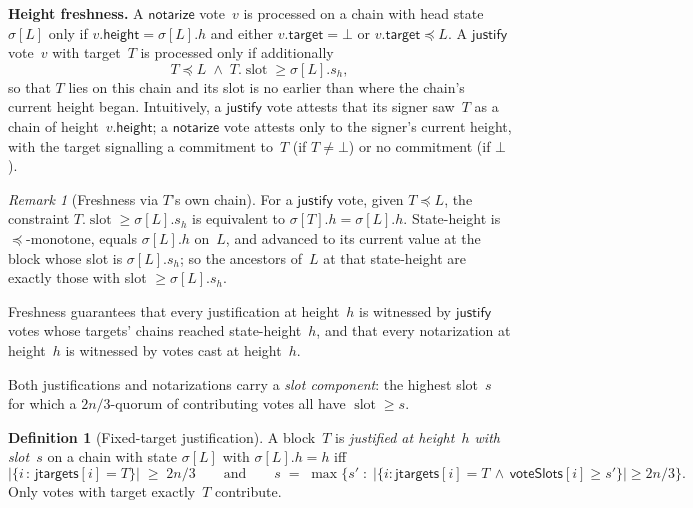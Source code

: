 \documentclass{article}
\newcommand{\slot}[0]{\ensuremath{\operatorname{\mathrm{slot}}}}
\newcommand{\target}{\mathsf{target}}
\newcommand{\height}{\mathsf{height}}
\newcommand{\just}{\ensuremath{\mathsf{justify}}\xspace}
\newcommand{\notar}{\ensuremath{\mathsf{notarize}}\xspace}
\newcommand{\jtargets}{\mathsf{jtargets}}
\newcommand{\voteSlots}{\mathsf{voteSlots}}
\renewcommand{\paragraph}[1]{\vspace{7pt}\noindent\textbf{#1}}
\theoremstyle{plain}
\theoremstyle{definition}
\newtheorem{definition}[theorem]{Definition}
\theoremstyle{remark}
\newtheorem{remark}[theorem]{Remark}
\begin{document}
\paragraph{Height freshness.}
A \notar vote~$v$ is processed on a chain with head state $\sigma[L]$ only if $v.\height = \sigma[L].h$ and either $v.\target = \bot$ or $v.\target \preceq L$.
A \just vote~$v$ with target~$T$ is processed only if additionally
\[
  T \preceq L \;\wedge\; T.\slot \geq \sigma[L].s_h,
\]
so that $T$ lies on this chain and its slot is no earlier than where the chain's current height began.
Intuitively, a \just vote attests that its signer saw~$T$ as a chain of height~$v.\height$; a \notar vote attests only to the signer's current height, with the target signalling a commitment to~$T$ (if $T \neq \bot$) or no commitment (if $\bot$).

\begin{remark}[Freshness via $T$'s own chain]\label{rem:fresh-equiv}
For a \just vote, given $T \preceq L$, the constraint $T.\slot \geq \sigma[L].s_h$ is equivalent to $\sigma[T].h = \sigma[L].h$.
State-height is $\preceq$-monotone, equals $\sigma[L].h$ on~$L$, and advanced to its current value at the block whose slot is $\sigma[L].s_h$; so the ancestors of~$L$ at that state-height are exactly those with slot $\geq \sigma[L].s_h$.
\end{remark}

Freshness guarantees that every justification at height~$h$ is witnessed by \just votes whose targets' chains reached state-height~$h$, and that every notarization at height~$h$ is witnessed by votes cast at height~$h$.

Both justifications and notarizations carry a \emph{slot component}: the highest slot~$s$ for which a $2n/3$-quorum of contributing votes all have $\slot \geq s$.

\begin{definition}[Fixed-target justification]\label{def:justification}
A block~$T$ is \emph{justified at height~$h$ with slot~$s$} on a chain with state $\sigma[L]$ with $\sigma[L].h = h$ iff
\[
  \bigl|\{i \,:\, \jtargets[i] = T\}\bigr| \;\geq\; 2n/3
  \qquad\text{and}\qquad
  s \;=\; \max\bigl\{s' \;:\; |\{i : \jtargets[i] = T \,\wedge\, \voteSlots[i] \geq s'\}| \geq 2n/3\bigr\}.
\]
Only votes with target exactly~$T$ contribute.
\end{definition}
\end{document}
